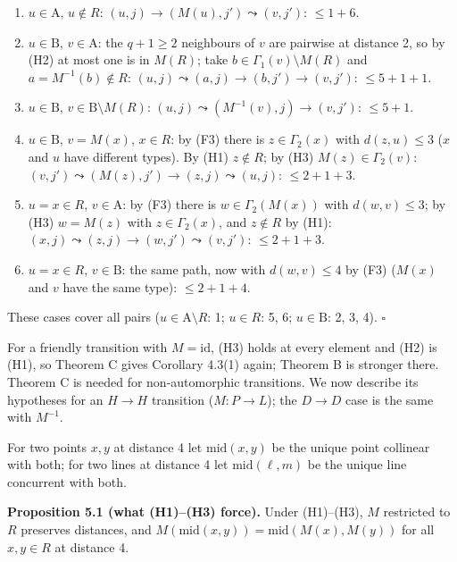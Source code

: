\documentclass[
  11pt,
]{article}
\providecommand{\tightlist}{%
  \setlength{\itemsep}{0pt}\setlength{\parskip}{0pt}}
\begin{document}
\begin{enumerate}
\def\labelenumi{\arabic{enumi}.}
\tightlist
\item
  \(u\in \mathrm A\), \(u\notin R\): \((u,j)\to(M(u),j')\leadsto(v,j')\): \(\le 1+6\).
\item
  \(u\in\mathrm B\), \(v\in\mathrm A\): the \(q+1\ge 2\) neighbours of \(v\) are pairwise at distance 2, so by (H2) at
  most one is in \(M(R)\); take \(b\in\Gamma_1(v)\setminus M(R)\) and \(a = M^{-1}(b)\notin R\):
  \((u,j)\leadsto(a,j)\to(b,j')\to(v,j')\): \(\le 5+1+1\).
\item
  \(u\in\mathrm B\), \(v\in\mathrm B\setminus M(R)\): \((u,j)\leadsto(M^{-1}(v),j)\to(v,j')\): \(\le 5+1\).
\item
  \(u\in\mathrm B\), \(v = M(x)\), \(x\in R\): by (F3) there is \(z\in\Gamma_2(x)\) with \(d(z,u)\le 3\) (\(x\) and
  \(u\) have different types). By (H1) \(z\notin R\); by (H3) \(M(z)\in\Gamma_2(v)\):
  \((v,j')\leadsto(M(z),j')\to(z,j)\leadsto(u,j)\): \(\le 2+1+3\).
\item
  \(u = x\in R\), \(v\in\mathrm A\): by (F3) there is \(w\in\Gamma_2(M(x))\) with \(d(w,v)\le 3\); by (H3) \(w = M(z)\)
  with \(z\in\Gamma_2(x)\), and \(z\notin R\) by (H1): \((x,j)\leadsto(z,j)\to(w,j')\leadsto(v,j')\): \(\le 2+1+3\).
\item
  \(u = x\in R\), \(v\in\mathrm B\): the same path, now with \(d(w,v)\le 4\) by (F3) (\(M(x)\) and \(v\) have the same
  type): \(\le 2+1+4\).
\end{enumerate}

These cases cover all pairs (\(u\in\mathrm A\setminus R\): 1; \(u\in R\): 5, 6; \(u\in\mathrm B\): 2, 3, 4). \(\square\)

For a friendly transition with \(M = \mathrm{id}\), (H3) holds at every element and (H2) is (H1), so Theorem C gives
Corollary 4.3(1) again; Theorem B is stronger there. Theorem C is needed for non-automorphic transitions. We now
describe its hypotheses for an \(H\to H\) transition (\(M: P\to L\)); the \(D\to D\) case is the same with \(M^{-1}\).

For two points \(x, y\) at distance 4 let \(\mathrm{mid}(x,y)\) be the unique point collinear with both; for two lines
at distance 4 let \(\mathrm{mid}(\ell,m)\) be the unique line concurrent with both.

\textbf{Proposition 5.1 (what (H1)--(H3) force).} Under (H1)--(H3), \(M\) restricted to \(R\) preserves distances, and
\(M(\mathrm{mid}(x,y)) = \mathrm{mid}(M(x), M(y))\) for all \(x, y\in R\) at distance 4.
\end{document}
